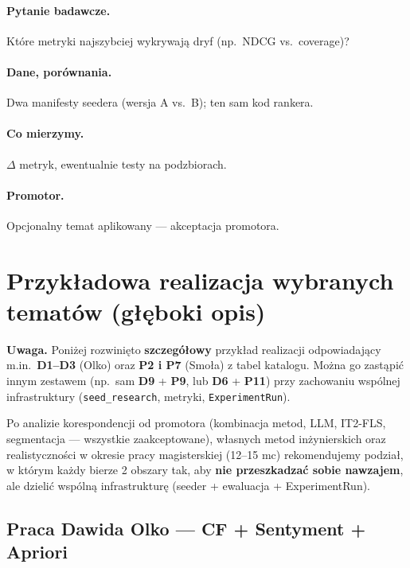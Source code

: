 \documentclass[a4paper,11pt]{article}
\begin{document}
\paragraph{Pytanie badawcze.}
Które metryki najszybciej wykrywają dryf (np.\ NDCG vs.\ coverage)?

\paragraph{Dane, porównania.}
Dwa manifesty seedera (wersja A vs.\ B); ten sam kod rankera.

\paragraph{Co mierzymy.}
$\Delta$ metryk, ewentualnie testy na podzbiorach.

\paragraph{Promotor.}
Opcjonalny temat aplikowany --- akceptacja promotora.

\newpage
\section{Przykładowa realizacja wybranych tematów (głęboki opis)}\label{sec:deep-dive}

\noindent\textbf{Uwaga.} Poniżej rozwinięto \textbf{szczegółowy} przykład realizacji odpowiadający m.in.\ \textbf{D1--D3} (Olko) oraz \textbf{P2 i P7} (Smoła) z tabel katalogu. Można go zastąpić innym zestawem (np.\ sam \textbf{D9} + \textbf{P9}, lub \textbf{D6} + \textbf{P11}) przy zachowaniu wspólnej infrastruktury (\texttt{seed\_research}, metryki, \texttt{ExperimentRun}).

\medskip
Po analizie korespondencji od promotora (kombinacja metod, LLM, IT2-FLS, segmentacja --- wszystkie zaakceptowane), własnych metod inżynierskich oraz realistyczności w okresie pracy magisterskiej (12--15 mc) rekomendujemy podział, w którym każdy bierze 2 obszary tak, aby \textbf{nie przeszkadzać sobie nawzajem}, ale dzielić wspólną infrastrukturę (seeder + ewaluacja + ExperimentRun).

\subsection{Praca Dawida Olko --- CF + Sentyment + Apriori}
\end{document}
